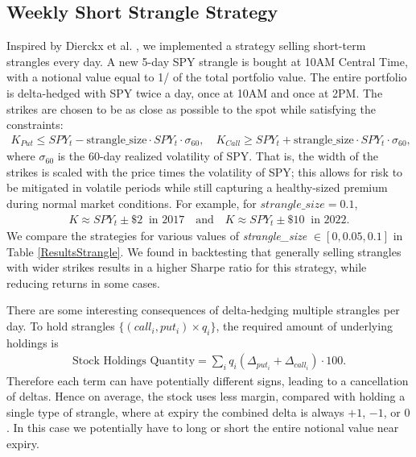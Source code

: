 \documentclass[10pt]{article}
\theoremstyle{definition}
\begin{document}
\subsection{Weekly Short Strangle Strategy} \label{strangle}
Inspired by Dierckx et al. \cite{dierckx_trading_2022}, we implemented a strategy selling short-term strangles every day. A new 5-day SPY strangle is bought at 10AM Central Time, with a notional value equal to 1/ of the total portfolio value. The entire portfolio is delta-hedged with SPY twice a day, once at 10AM and once at 2PM. The strikes are chosen to be as close as possible to the spot while satisfying the constraints:
\begin{align*}
    K_{Put} \leq SPY_t - \textrm{strangle\_size} \cdot SPY_t \cdot \sigma_{60}, \quad K_{Call} \geq SPY_t + \textrm{strangle\_size} \cdot SPY_t \cdot \sigma_{60},
\end{align*}
where $\sigma_{60}$ is the 60-day realized volatility of SPY. That is, the width of the strikes is scaled with the price times the volatility of SPY; this allows for risk to be mitigated in volatile periods while still capturing a healthy-sized premium during normal market conditions. For example, for $strangle\_size = 0.1$, 
\begin{align*}
    K \approx SPY_t \pm \$2\ \textrm{  in 2017} \quad \textrm{and} \quad K \approx SPY_t \pm \$10\ \textrm{ in 2022}.
\end{align*} We compare the strategies for various values of \textit{strangle\_size} $\in [0,0.05,0.1]$ in Table \ref{ResultsStrangle}. We found in backtesting that generally selling strangles with wider strikes results in a higher Sharpe ratio for this strategy, while reducing returns in some cases.

There are some interesting consequences of delta-hedging multiple strangles per day. To hold strangles $\{(call_i, put_i) \times q_i \}$, the required amount of underlying holdings is 
\begin{align}
    \text{Stock Holdings Quantity} = \sum_i q_i (\Delta_{put_i} + \Delta_{call_i}) \cdot 100.
\end{align}
Therefore each term can have potentially different signs, leading to a cancellation of deltas.  Hence on average, the stock uses less margin, compared with holding a single type of strangle, where at expiry the combined delta is always $+1$, $-1$, or $0$. In this case we potentially have to long or short the entire notional value near expiry.
\end{document}
